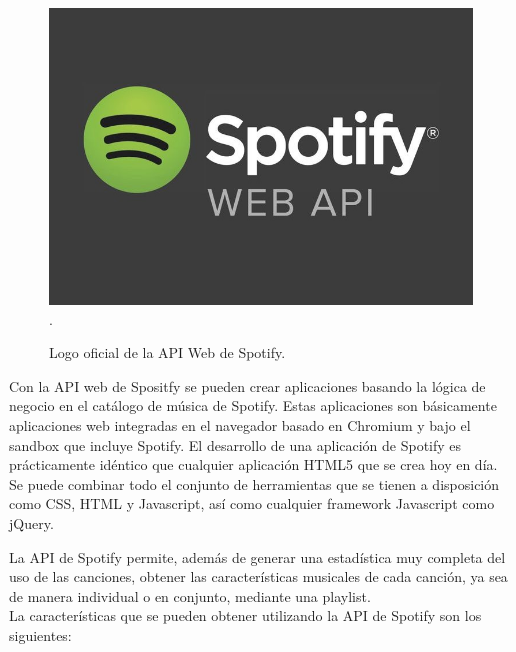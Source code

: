 \documentclass[conference]{IEEEtran}
\begin{document}
\begin{figure}[ht]
    \centering
    \includegraphics[scale=0.20]{./images/APIWebSpotify.jpg}
    \DeclareGraphicsExtensions.
    \caption{ Logo oficial de la API Web de Spotify. }
\end{figure}

Con la API web de Spositfy se pueden crear aplicaciones basando la lógica de negocio en el catálogo de música de Spotify. Estas aplicaciones son básicamente aplicaciones web integradas en el navegador basado en Chromium y bajo el sandbox que incluye Spotify. El desarrollo de una aplicación de Spotify es prácticamente idéntico que cualquier aplicación HTML5 que se crea hoy en día. Se puede combinar todo el conjunto de herramientas que se tienen a disposición como CSS, HTML y Javascript, así como cualquier framework Javascript como jQuery.

La API de Spotify permite, además de generar una estadística muy completa del uso de las canciones, obtener las características musicales de cada canción, ya sea de manera individual o en conjunto, mediante una playlist.\\
La características que se pueden obtener utilizando la API de Spotify son los siguientes: \\
\end{document}
